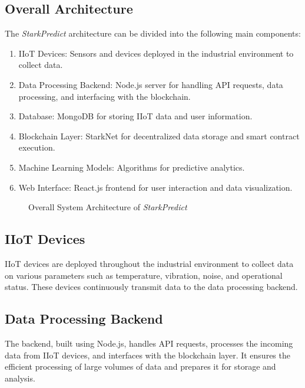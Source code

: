 \documentclass{article}
\begin{document}
\subsection{Overall Architecture}

The \textit{StarkPredict} architecture can be divided into the following main components:

\begin{enumerate}
    \item IIoT Devices: Sensors and devices deployed in the industrial environment to collect data.
    \item Data Processing Backend: Node.js server for handling API requests, data processing, and interfacing with the blockchain.
    \item Database: MongoDB for storing IIoT data and user information.
    \item Blockchain Layer: StarkNet for decentralized data storage and smart contract execution.
    \item Machine Learning Models: Algorithms for predictive analytics.
    \item Web Interface: React.js frontend for user interaction and data visualization.
\end{enumerate}

\begin{figure}
    \centering
    
    \caption{Overall System Architecture of \textit{StarkPredict}}
    \label{fig:system_architecture}
\end{figure}

\subsection{IIoT Devices}

IIoT devices are deployed throughout the industrial environment to collect data on various parameters such as temperature, vibration, noise, and operational status. These devices continuously transmit data to the data processing backend.

\subsection{Data Processing Backend}

The backend, built using Node.js, handles API requests, processes the incoming data from IIoT devices, and interfaces with the blockchain layer. It ensures the efficient processing of large volumes of data and prepares it for storage and analysis.
\end{document}
